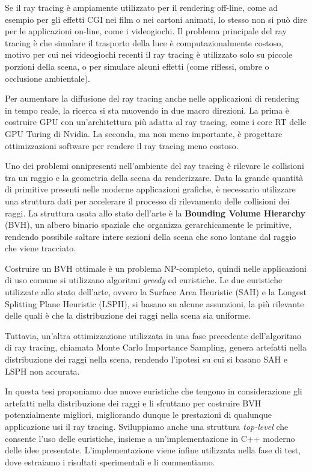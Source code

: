 \documentclass{PoliMi_MasterThesis}
\begin{document}
Se il ray tracing è ampiamente utilizzato per il rendering off-line, come ad esempio per gli effetti CGI nei film o nei cartoni animati, lo stesso non si può dire per le applicazioni on-line, come i videogiochi. Il problema principale del ray tracing è che simulare il trasporto della luce è computazionalmente costoso, motivo per cui nei videogiochi recenti il ray tracing è utilizzato solo su piccole porzioni della scena, o per simulare alcuni effetti (come riflessi, ombre o occlusione ambientale).

Per aumentare la diffusione del ray tracing anche nelle applicazioni di rendering in tempo reale, la ricerca si sta muovendo in due macro direzioni. La prima è costruire GPU con un'architettura più adatta al ray tracing, come i core RT delle GPU Turing di Nvidia. La seconda, ma non meno importante, è progettare ottimizzazioni software per rendere il ray tracing meno costoso.

Uno dei problemi onnipresenti nell'ambiente del ray tracing è rilevare le collisioni tra un raggio e la geometria della scena da renderizzare. Data la grande quantità di primitive presenti nelle moderne applicazioni grafiche, è necessario utilizzare una struttura dati per accelerare il processo di rilevamento delle collisioni dei raggi. La struttura usata allo stato dell'arte è la \textbf{Bounding Volume Hierarchy} (BVH), un albero binario spaziale che organizza gerarchicamente le primitive, rendendo possibile saltare intere sezioni della scena che sono lontane dal raggio che viene tracciato.

Costruire un BVH ottimale è un problema NP-completo, quindi nelle applicazioni di uso comune si utilizzano algoritmi \textit{greedy} ed euristiche. Le due euristiche utilizzate allo stato dell'arte, ovvero la Surface Area Heuristic (SAH) e la Longest Splitting Plane Heuristic (LSPH), si basano su alcune assunzioni, la più rilevante delle quali è che la distribuzione dei raggi nella scena sia uniforme.

Tuttavia, un'altra ottimizzazione utilizzata in una fase precedente dell'algoritmo di ray tracing, chiamata Monte Carlo Importance Sampling, genera artefatti nella distribuzione dei raggi nella scena, rendendo l'ipotesi su cui si basano SAH e LSPH non accurata.

In questa tesi proponiamo due nuove euristiche che tengono in considerazione gli artefatti nella distribuzione dei raggi e li sfruttano per costruire BVH potenzialmente migliori, migliorando dunque le prestazioni di qualunque applicazione usi il ray tracing. Sviluppiamo anche una struttura \textit{top-level} che consente l'uso delle euristiche, insieme a un'implementazione in C++ moderno delle idee presentate. L'implementazione viene infine utilizzata nella fase di test, dove estraiamo i risultati sperimentali e li commentiamo.
\end{document}
